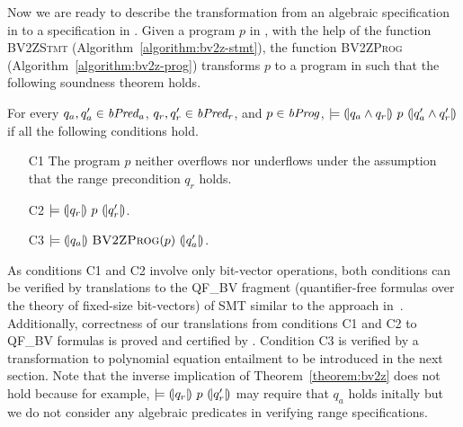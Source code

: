 Now we are ready to describe the transformation from an algebraic specification in \bvdsl to a specification in \zdsl.
Given a program $p$ in \bvdsl, with the help of the function \textsc{BV2ZStmt} (Algorithm~\ref{algorithm:bv2z-stmt}), the function \textsc{BV2ZProg} (Algorithm~\ref{algorithm:bv2z-prog}) transforms $p$ to a program in \zdsl such that the following soundness theorem holds.
\begin{theorem}
  For every $q_a, q_a' \in \mathit{bPred_a}$, $q_r, q_r' \in \mathit{bPred_r}$, and $p \in \mathit{bProg}$, $\models {(\!|}{q_a \wedge q_r}{|\!)}~{p}~{(\!|}{q_a' \wedge q_r'}{|\!)}$ if all the following conditions hold.
  \begin{itemize}
  \item[C1] The program $p$ neither overflows nor underflows under the assumption that the range precondition $q_r$ holds.
  \item[C2] $\models {(\!|}{q_r}{|\!)}~{p}~{(\!|}{q_r'}{|\!)}$.
  \item[C3] $\models {(\!|}{q_a}{|\!)}~{\textsc{BV2ZProg}(p)}~{(\!|}{q_a'}{|\!)}$.
  \end{itemize}
  \label{theorem:bv2z}
\end{theorem}
As conditions C1 and C2 involve only bit-vector operations, both conditions can be verified by translations to the QF\_BV fragment (quantifier-free formulas over the theory of fixed-size bit-vectors) of SMT similar to the approach in~\cite{C:14:VCS}.
Additionally, correctness of our translations from conditions C1 and C2 to QF\_BV formulas is proved and certified by \coq.
Condition C3 is verified by a transformation to polynomial equation entailment to be introduced in the next section.
Note that the inverse implication of Theorem~\ref{theorem:bv2z} does not hold because for example, $\models {(\!|}{q_r}{|\!)}~{p}~{(\!|}{q_r'}{|\!)}$ may require that $q_a$ holds initally but we do not consider any algebraic predicates in verifying range specifications.

